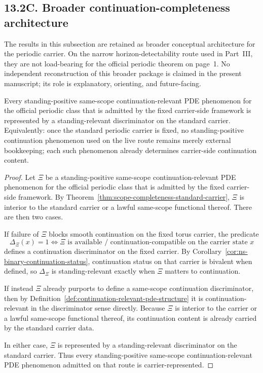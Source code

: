 \subsection*{13.2C. Broader continuation-completeness architecture}
The results in this subsection are retained as broader conceptual architecture for the periodic carrier. On the narrow horizon-detectability route used in Part~III, they are not load-bearing for the official periodic theorem on page~1. No independent reconstruction of this broader package is claimed in the present manuscript; its role is explanatory, orienting, and future-facing.

\begin{theorem}
\label{thm:strong-continuation-completeness-standard-carrier}
Every standing-positive same-scope continuation-relevant PDE phenomenon for the official periodic class that is admitted by the fixed carrier-side framework is represented by a standing-relevant discriminator on the standard carrier. Equivalently: once the standard periodic carrier is fixed, no standing-positive continuation phenomenon used on the live route remains merely external bookkeeping; each such phenomenon already determines carrier-side continuation content.
\end{theorem}

\begin{proof}
Let $\Xi$ be a standing-positive same-scope continuation-relevant PDE phenomenon for the official periodic class that is admitted by the fixed carrier-side framework.
By Theorem~\ref{thm:scope-completeness-standard-carrier}, $\Xi$ is interior to the standard carrier or a lawful same-scope functional thereof. There are then two cases.

If failure of $\Xi$ blocks smooth continuation on the fixed torus carrier, the predicate
\[
\Delta_{\Xi}(x)=1 \iff \text{$\Xi$ is available / continuation-compatible on the carrier state $x$}
\]
defines a continuation discriminator on the fixed carrier. By Corollary~\ref{cor:ns-binary-continuation-status}, continuation status on that carrier is bivalent when defined, so $\Delta_{\Xi}$ is standing-relevant exactly when $\Xi$ matters to continuation.

If instead $\Xi$ already purports to define a same-scope continuation discriminator, then by Definition~\ref{def:continuation-relevant-pde-structure} it is continuation-relevant in the discriminator sense directly. Because $\Xi$ is interior to the carrier or a lawful same-scope functional thereof, its continuation content is already carried by the standard carrier data.

In either case, $\Xi$ is represented by a standing-relevant discriminator on the standard carrier. Thus every standing-positive same-scope continuation-relevant PDE phenomenon admitted on that route is carrier-represented.
\end{proof}

